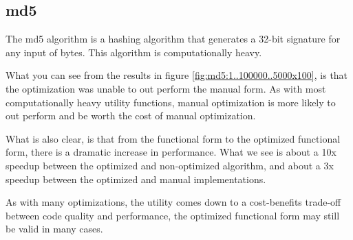 \subsection{md5}
The md5 algorithm is a hashing algorithm that generates a 32-bit signature for any input of bytes. This algorithm is computationally heavy.

What you can see from the results in figure \ref{fig:md5:1..100000..5000x100}, is that the optimization was unable to out perform the manual form.  As with most computationally heavy utility functions, manual optimization is more likely to out perform and be worth the cost of manual optimization.  

What is also clear, is that from the functional form to the optimized functional form, there is a dramatic increase in performance.  What we see is about a 10x speedup between the optimized and non-optimized algorithm, and about a 3x speedup between the optimized and manual implementations.  

As with many optimizations, the utility comes down to a cost-benefits trade-off between code quality and performance, the optimized functional form may still be valid in many cases.